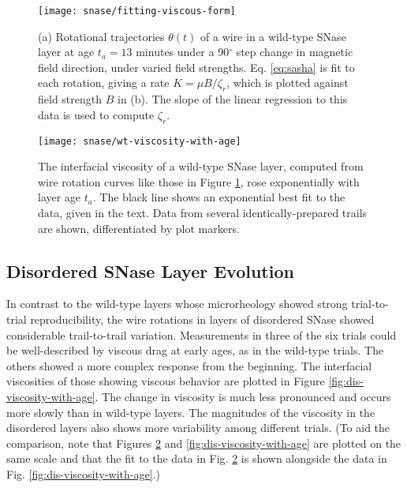    \begin{figure}
    \centering
    \texttt{[image: snase/fitting-viscous-form]} %
    \caption{\label{fig:fitting-viscous-form}(a) Rotational trajectories $\theta(t)$ of a wire in a wild-type SNase layer at age $t_a=13$ minutes under a 90$^\circ$ step change in magnetic field direction, under varied field strengths. Eq. \ref{eq:sasha} is fit to each rotation, giving a rate $K=\mu B/\zeta_r$, which is plotted against field strength $B$ in (b). The slope of the linear regression to this data is used to compute $\zeta_r$.}
    \end{figure}

   \begin{figure}
    \centering
    \texttt{[image: snase/wt-viscosity-with-age]}
    \caption{\label{fig:wt-viscosity-with-age}The interfacial viscosity of a wild-type SNase layer, computed from wire rotation curves like those in Figure \ref{fig:fitting-viscous-form}, rose exponentially with layer age $t_a$. The black line shows an exponential best fit to the data, given in the text. Data from several identically-prepared trails are shown, differentiated by plot markers.}
    \end{figure}
   

\subsection{Disordered SNase Layer Evolution}

In contrast to the wild-type layers whose microrheology showed strong trial-to-trial reproducibility, the wire rotations in layers of disordered SNase showed considerable trail-to-trail variation. Measurements in three of the six trials could be well-described by viscous drag at early ages, as in the wild-type trials. The others showed a more complex response from the beginning. The interfacial viscosities of those showing viscous behavior are plotted in Figure \ref{fig:dis-viscosity-with-age}. The change in viscosity is much less pronounced and occurs more slowly than in wild-type layers. The magnitudes of the viscosity in the disordered layers also shows more variability among different trials. (To aid the comparison, note that Figures \ref{fig:wt-viscosity-with-age} and \ref{fig:dis-viscosity-with-age} are plotted on the same scale and that the fit to the data in Fig. \ref{fig:wt-viscosity-with-age} is shown alongside the data in Fig. \ref{fig:dis-viscosity-with-age}.)

